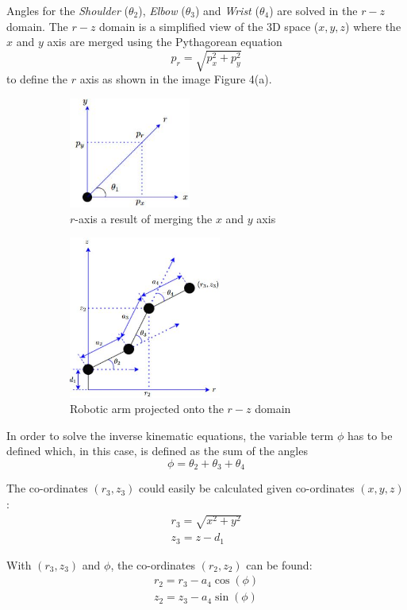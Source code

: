 \documentclass[9pt, a4paper]{article}
\begin{document}
Angles for the \textit{Shoulder} ($\theta_2$), \textit{Elbow} ($\theta_3$) and
\textit{Wrist} ($\theta_4$) are solved in the $r-z$ domain. The $r-z$ domain is
a simplified view of the 3D space ($x,y,z$) where the $x$ and $y$ axis are
merged using the Pythagorean equation 
$$
  p_r = \sqrt{p_x^2 + p_y^2}
$$
to define the $r$ axis as shown in the image Figure 4(a).
\begin{figure}[h]
  \centering
  \begin{subfigure}{.5\textwidth}
    \centering
    \includegraphics[width=4cm]{r.JPG}
    \caption{$r$-axis a result of merging the $x$ and $y$ axis}
  \end{subfigure}%
  \begin{subfigure}{.5\textwidth}
    \centering
    \includegraphics[width=5cm]{arm r domain.JPG}
    \caption{Robotic arm projected onto the $r-z$ domain}
  \end{subfigure}
  \caption{\cite{Coordinate_frame}}
\end{figure}

In order to solve the inverse kinematic equations, the variable term $\phi$ has
to be defined which, in this case, is defined as the sum of the angles
$$
  \phi = \theta_2 + \theta_3 + \theta_4
$$

The co-ordinates $(r_3, z_3)$ could easily be calculated given co-ordinates $(x,
y, z)$:
\begin{gather*}
  r_3 = \sqrt{x^2 + y^2} \\ 
  z_3 = z - d_1
\end{gather*}

With $(r_3, z_3)$ and $\phi$, the co-ordinates $(r_2, z_2)$ can be found:
\begin{gather*}
  r_2 = r_3 - a_4 \cos(\phi) \\ 
  z_2 = z_3 - a_4 \sin(\phi)
\end{gather*}
\end{document}
